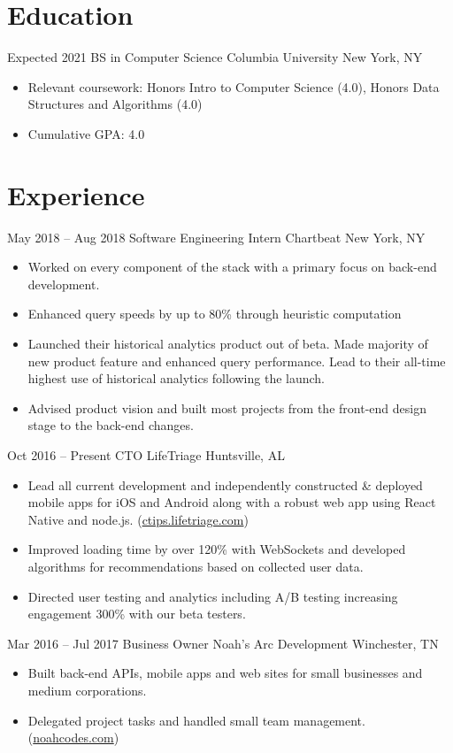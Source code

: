 \documentclass[letterpaper]{moderncv}        %
\begin{document}
\makecvtitle
\section{Education}
\cventry
{Expected 2021}
{BS in Computer Science}
{Columbia University}
{New York, NY}
{}
{\begin{itemize}%
	\item Relevant coursework: Honors Intro to Computer Science (4.0), Honors Data Structures and Algorithms (4.0)
         \item Cumulative GPA: 4.0
	\end{itemize}}
\section{Experience}
\cventry
{May 2018 -- Aug 2018}
{Software Engineering Intern}
{Chartbeat}
{New York, NY}
{}
{\begin{itemize}%
	\item Worked on every component of the stack with a primary focus on back-end development.
	\item Enhanced query speeds by up to 80\% through heuristic computation
	\item Launched their historical analytics product out of beta. Made majority of new product feature and enhanced query performance. Lead to their all-time highest use of historical analytics following the launch.
	\item Advised product vision and built most projects from the front-end design stage to the back-end changes.
	\end{itemize}}
\cventry
{Oct 2016 -- Present}
{CTO}
{LifeTriage}
{Huntsville, AL}
{}
{\begin{itemize}%
	\item Lead all current development and independently constructed \& deployed mobile apps for iOS and Android along with a robust web app using React Native and node.js. (\href{https://ctips.lifetriage.com}{ctips.lifetriage.com})
	\item Improved loading time by over 120\% with WebSockets and developed algorithms for recommendations based on collected user data.
	\item Directed user testing and analytics including A/B testing increasing engagement 300\% with our beta testers.
	\end{itemize}}
\cventry
{Mar 2016 -- Jul 2017}
{Business Owner}
{Noah's Arc Development}
{Winchester, TN}
{}
{\begin{itemize}%
	\item  Built back-end APIs, mobile apps and web sites for small businesses and medium corporations.
	\item  Delegated project tasks and handled small team management. (\href{https://noahcodes.com/}{noahcodes.com})
	\end{itemize}}
\end{document}
